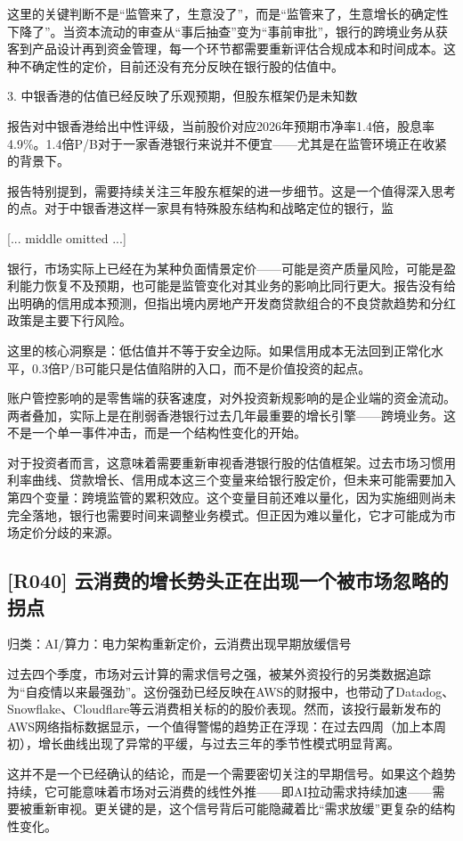 \documentclass[11pt]{ctexart}
\begin{document}
这里的关键判断不是“监管来了，生意没了”，而是“监管来了，生意增长的确定性下降了”。当资本流动的审查从“事后抽查”变为“事前审批”，银行的跨境业务从获客到产品设计再到资金管理，每一个环节都需要重新评估合规成本和时间成本。这种不确定性的定价，目前还没有充分反映在银行股的估值中。

3. 中银香港的估值已经反映了乐观预期，但股东框架仍是未知数

报告对中银香港给出中性评级，当前股价对应2026年预期市净率1.4倍，股息率4.9\%。1.4倍P/B对于一家香港银行来说并不便宜——尤其是在监管环境正在收紧的背景下。

报告特别提到，需要持续关注三年股东框架的进一步细节。这是一个值得深入思考的点。对于中银香港这样一家具有特殊股东结构和战略定位的银行，监

[... middle omitted ...]

银行，市场实际上已经在为某种负面情景定价——可能是资产质量风险，可能是盈利能力恢复不及预期，也可能是监管变化对其业务的影响比同行更大。报告没有给出明确的信用成本预测，但指出境内房地产开发商贷款组合的不良贷款趋势和分红政策是主要下行风险。

这里的核心洞察是：低估值并不等于安全边际。如果信用成本无法回到正常化水平，0.3倍P/B可能只是估值陷阱的入口，而不是价值投资的起点。

账户管控影响的是零售端的获客速度，对外投资新规影响的是企业端的资金流动。两者叠加，实际上是在削弱香港银行过去几年最重要的增长引擎——跨境业务。这不是一个单一事件冲击，而是一个结构性变化的开始。

对于投资者而言，这意味着需要重新审视香港银行股的估值框架。过去市场习惯用利率曲线、贷款增长、信用成本这三个变量来给银行股定价，但未来可能需要加入第四个变量：跨境监管的累积效应。这个变量目前还难以量化，因为实施细则尚未完全落地，银行也需要时间来调整业务模式。但正因为难以量化，它才可能成为市场定价分歧的来源。

\subsection{[R040] 云消费的增长势头正在出现一个被市场忽略的拐点}
{\small\color{refgray}归类：AI/算力：电力架构重新定价，云消费出现早期放缓信号}

过去四个季度，市场对云计算的需求信号之强，被某外资投行的另类数据追踪为“自疫情以来最强劲”。这份强劲已经反映在AWS的财报中，也带动了Datadog、Snowflake、Cloudflare等云消费相关标的的股价表现。然而，该投行最新发布的AWS网络指标数据显示，一个值得警惕的趋势正在浮现：在过去四周（加上本周初），增长曲线出现了异常的平缓，与过去三年的季节性模式明显背离。

这并不是一个已经确认的结论，而是一个需要密切关注的早期信号。如果这个趋势持续，它可能意味着市场对云消费的线性外推——即AI拉动需求持续加速——需要被重新审视。更关键的是，这个信号背后可能隐藏着比“需求放缓”更复杂的结构性变化。
\end{document}
